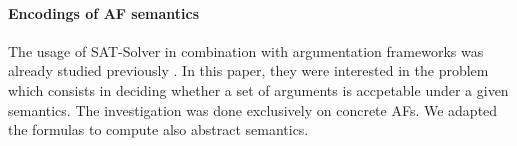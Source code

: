 \paragraph{Encodings of AF semantics} The usage of SAT-Solver in combination with argumentation frameworks was already studied previously \cite{inproceedingsBesnardDoutreBooleanFormulaSemantics}. In this paper, they were interested in the problem which consists in deciding whether a set of arguments is accpetable under a given semantics. The investigation was done exclusively on concrete AFs. We adapted the formulas to compute also abstract semantics.




